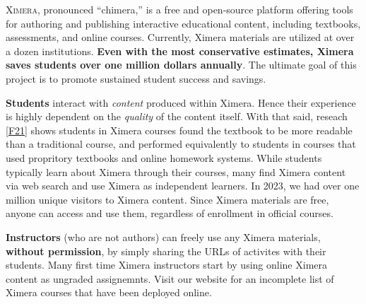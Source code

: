 \documentclass[twocolumn]{article}
\begin{document}
\pagestyle{main}
\thispagestyle{title}
\noindent
\lettrine[lines=2]{X}{imera}, pronounced ``chimera,'' is a free and
open-source platform offering tools for authoring and publishing
interactive educational content, including textbooks, assessments, and
online
courses. Currently, Ximera materials are utilized at over a dozen
institutions. \textbf{Even with the most conservative estimates, Ximera saves
    students
    over one million dollars annually}. The ultimate goal of this project is to
promote sustained student success and savings.

\begin{xframe}
    {\sffamily\bfseries Students} interact with \textit{content} produced
    within
    Ximera. Hence their experience is highly dependent on the
    \textit{quality} of
    the content itself. With that said, reseach \ref{F21} shows students in
    Ximera courses found the textbook to be more readable than a traditional
    course, and performed equivalently to students in courses that used
    propritory textbooks and online homework systems.
    While students typically learn about Ximera through their courses, many
    find Ximera content via web search and  use Ximera as independent learners.
    In 2023, we had over one million unique visitors to Ximera content. Since
    Ximera materials are free,
    anyone can access and use them, regardless of enrollment in official
    courses.
\end{xframe}

\begin{xframe}
    {\sffamily\bfseries Instructors} (who are not authors) can freely use
    any Ximera materials,
    \textbf{without permission}, by simply sharing the URLs of activites
    with their students. Many first time Ximera instructors start  by
    using online Ximera content as
    ungraded assignemnts. Visit our website for an incomplete list of
    Ximera courses that have been deployed online.
\end{xframe}
\end{document}
